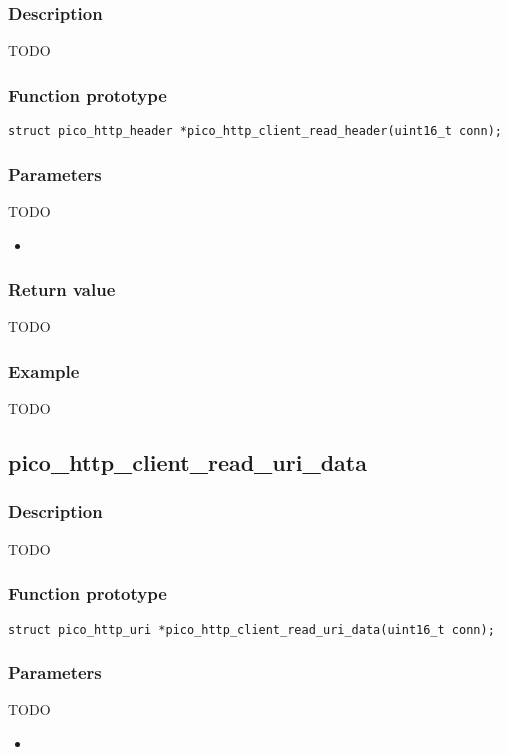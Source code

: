 \subsubsection*{Description}
TODO

\subsubsection*{Function prototype}
\texttt{struct pico\_http\_header *pico\_http\_client\_read\_header(uint16\_t conn);}

\subsubsection*{Parameters}
TODO
\begin{itemize}[noitemsep]
\item \texttt{}
\end{itemize}
\subsubsection*{Return value}
TODO
\subsubsection*{Example}
TODO


\subsection{pico\_http\_client\_read\_uri\_data}

\subsubsection*{Description}
TODO

\subsubsection*{Function prototype}
\texttt{struct pico\_http\_uri *pico\_http\_client\_read\_uri\_data(uint16\_t conn);}

\subsubsection*{Parameters}
TODO
\begin{itemize}[noitemsep]
\item \texttt{}
\end{itemize}
